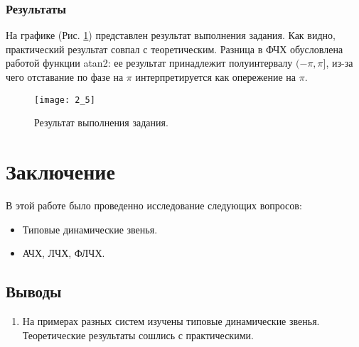 \documentclass[16pt]{article}
\begin{document}
\subsubsection{Результаты}
На графике (Рис. \ref*{fig:fig5}) представлен результат выполнения задания. Как видно, практический результат совпал с теоретическим. Разница в ФЧХ обусловлена работой функции atan2: ее результат принадлежит полуинтервалу \((-\pi, \pi]\), из-за чего отставание по фазе на \(\pi\) интерпретируется как опережение на \(\pi\).
\begin{figure}[h!]
    \centering
    \texttt{[image: 2\_5]}
    \caption{Результат выполнения задания.}
    \label{fig:fig5}
\end{figure}










\newpage
\section{Заключение}
В этой работе было проведенно исследование следующих вопросов:
\begin{itemize}
    \item Типовые динамические звенья.
    \item АЧХ, ЛЧХ, ФЛЧХ.
\end{itemize} 
\subsection{Выводы}
\begin{enumerate}
   \item На примерах разных систем изучены типовые динамические звенья. Теоретические результаты сошлись с практическими.
\end{enumerate}
\end{document}
